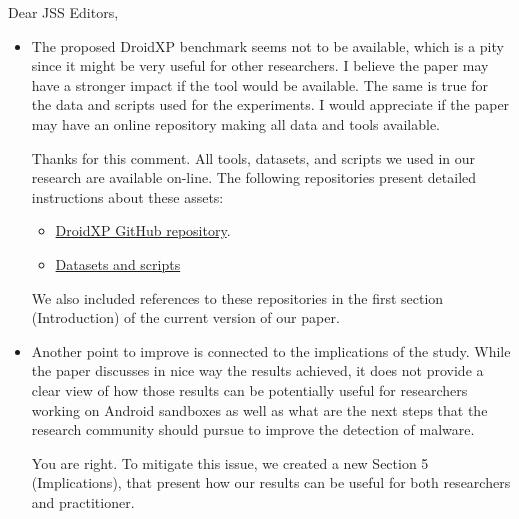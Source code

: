 \documentclass[12pt,english]{scrartcl}
\begin{document}
\begin{letter}{Dear JSS Editors,}
\begin{itemize}
\vspace{0.2cm}

\item The proposed DroidXP benchmark seems not to be available, which is a pity since it might be very useful for other 
researchers. I believe the paper may have a stronger impact if the tool would be available. The same is true for the 
data and scripts used for the experiments. I would appreciate if the paper may have an online repository making all 
data and tools available.


\vspace{0.2cm}

{\color{blue}{\bf Answer.} Thanks for this comment. All tools, datasets, and scripts we used in our research are available on-line. The following repositories present detailed instructions about these assets: 

  \begin{itemize}
    \item \href{https://github.com/droidxp/benchmark}{DroidXP GitHub repository}.
    \item \href{https://htmlpreview.github.io/?https://github.com/droidxp/paper-replication-package/blob/master/replication.html}{Datasets and scripts}
  \end{itemize}
  
  \vspace{0.2cm}
  
  We also included references to these repositories in the first section (Introduction) of the current version of
  our paper.}

\vspace{0.2cm}

\item Another point to improve is connected to the implications of the study. While the paper discusses in nice way the 
results achieved, it does not provide a clear view of how those results can be potentially useful for researchers 
working on Android sandboxes as well as what are the next steps that the research community should pursue to 
improve the detection of malware.


\vspace{0.2cm}

{\color{blue}{\bf Answer.} You are right. To mitigate this issue, we created a new Section 5 (Implications), that present how our results can be useful for both researchers and practitioner.}


\vspace{0.2cm}


\end{itemize}
\end{letter}
\end{document}
